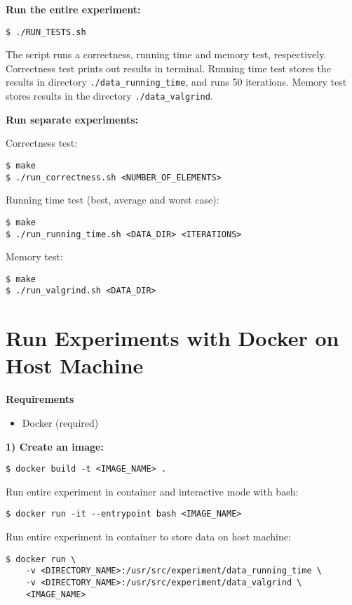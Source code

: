 \documentclass[a4paper,11pt]{kth-mag}
\newcommand*{\skippara}{\par\vspace{\baselineskip} \noindent}
\begin{document}
\skippara \textbf{Run the entire experiment:}
\begin{lstlisting}[basicstyle=\ttfamily, frame=single]
$ ./RUN_TESTS.sh
\end{lstlisting}
The script runs a correctness, running time and memory test, respectively.
Correctness test prints out results in terminal.
Running time test stores the results in directory \texttt{./data\_running\_time}, and runs 50 iterations.
Memory test stores results in the directory \texttt{./data\_valgrind}.

\skippara \textbf{Run separate experiments:}
\skippara Correctness test:
\begin{lstlisting}[basicstyle=\ttfamily, frame=single]
$ make
$ ./run_correctness.sh <NUMBER_OF_ELEMENTS>
\end{lstlisting}

\skippara Running time test (best, average and worst case):
\begin{lstlisting}[basicstyle=\ttfamily, frame=single]
$ make
$ ./run_running_time.sh <DATA_DIR> <ITERATIONS>
\end{lstlisting}

\skippara Memory test:
\begin{lstlisting}[basicstyle=\ttfamily, frame=single]
$ make
$ ./run_valgrind.sh <DATA_DIR>
\end{lstlisting}

\section{Run Experiments with Docker on Host Machine}
\textbf{Requirements}
\begin{itemize}
    \item Docker (required)
\end{itemize}

\skippara \textbf{1) Create an image:}
\begin{lstlisting}[basicstyle=\ttfamily, frame=single]
$ docker build -t <IMAGE_NAME> .
\end{lstlisting}

\skippara Run entire experiment in container and interactive mode with bash:
\begin{lstlisting}[basicstyle=\ttfamily, frame=single]
$ docker run -it --entrypoint bash <IMAGE_NAME>
\end{lstlisting}


\skippara Run entire experiment in container to store data on host machine:
\begin{lstlisting}[basicstyle=\ttfamily, frame=single]
$ docker run \
    -v <DIRECTORY_NAME>:/usr/src/experiment/data_running_time \
    -v <DIRECTORY_NAME>:/usr/src/experiment/data_valgrind \
    <IMAGE_NAME>
\end{lstlisting}
\end{document}
